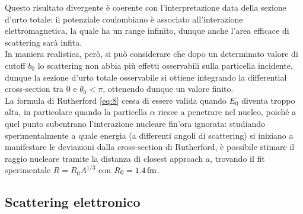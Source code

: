 Questo risultato divergente è coerente con l'interpretazione data della sezione d'urto totale: il potenziale coulombiano è associato all'interazione elettromagnetica, la quale ha un range infinito, dunque anche l'area efficace di scattering sarà infita.\\
In maniera realistica, però, si può considerare che dopo un determinato valore di cutoff $ b_0 $ lo scattering non abbia più effetti osservabili sulla particella incidente, dunque la sezione d'urto totale osservabile si ottiene integrando la differential cross-section tra $ 0 $ e $ \theta_0 < \pi$, ottenendo dunque un valore finito.\\
La formula di Rutherford \ref{eq:8} cessa di essere valida quando $ E_0 $ diventa troppo alta, in particolare quando la particella $ \alpha $ riesce a penetrare nel nucleo, poiché a quel punto subentrano l'interazione nucleare fin'ora ignorata: studiando sperimentalmente a quale energia (a differenti angoli di scattering) si iniziano a manifestare le deviazioni dalla cross-section di Rutherford, è possibile stimare il raggio nucleare tramite la distanza di closest approach $ a $, trovando il fit sperimentale $ R = R_0 A^{1/3} $ con $ R_0 = 1.4\,\text{fm} $.

\subsection{Scattering elettronico}

